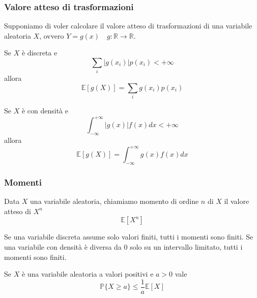 \subsubsection{Valore atteso di trasformazioni}
Supponiamo di voler calcolare il valore atteso di trasformazioni di una variabile aleatoria $X$, ovvero $Y=g(x) \quad g:\mathbb{R} \to \mathbb{R}$.
\begin{proposition}
	Se $X$ è discreta e
	\begin{equation*}
		\sum_{i} \lvert g(x_i) \rvert p(x_i) < +\infty
	\end{equation*}
	allora
	\begin{equation}
		\mathbb{E}[g(X)] = \sum_{i} g(x_i)p(x_i)
	\end{equation}
\end{proposition}
\begin{proposition}
	Se $X$ è con densità e
	\begin{equation*}
		\int_{-\infty}^{+\infty}\lvert g(x)\rvert f(x)dx < +\infty
	\end{equation*}
	allora
	\begin{equation}
		\mathbb{E}[g(X)] = \int_{-\infty}^{+\infty} g(x) f(x)dx
	\end{equation}
\end{proposition}
	
\subsubsection{Momenti}
\begin{definition}[Momento]
	Data $X$ una variabile aleatoria, chiamiamo momento di ordine $n$ di $X$ il valore atteso di $X^n$
	\begin{equation}
		\mathbb{E}[X^n]
	\end{equation}
\end{definition}

\begin{observation}
	Se una variabile discreta assume solo valori finiti, tutti i momenti sono finiti. Se una variabile con densità è diversa da $0$ solo su un intervallo limitato, tutti i momenti sono finiti.
\end{observation}

\begin{proposition}
	Se $X$ è una variabile aleatoria a valori positivi e $a>0$ vale
	\begin{equation}
		\mathbb{P}\{X \geq a\} \leq \frac{1}{a}\mathbb{E}[X]
	\end{equation}
\end{proposition}


